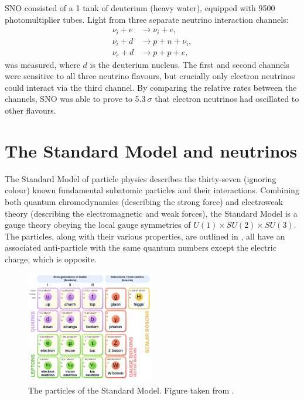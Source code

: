 SNO consisted of a \SI{1}{} tank of deuterium (heavy water), equipped with 9500
photomultiplier tubes. Light from three separate neutrino interaction channels:
\begin{align} %
    \nu_{i}+e & \rightarrow \nu_{i}+e, \\
    \nu_{i}+d & \rightarrow p+n+\nu_{i}, \\
    \nu_{e}+d & \rightarrow p+p+e,
\end{align}
was measured, where $d$ is the deuterium nucleus. The first and second channels were sensitive to
all three neutrino flavours, but crucially only electron neutrinos could interact via the third
channel. By comparing the relative rates between the channels, SNO was able to prove to
5.3$~\sigma$ that electron neutrinos had oscillated to other flavours.

\section{The Standard Model and neutrinos} %
\label{sec:theory_sm} %

The Standard Model of particle physics describes the thirty-seven (ignoring colour) known
fundamental subatomic particles and their interactions. Combining both quantum chromodynamics
(describing the strong force) and electroweak theory (describing the electromagnetic and weak
forces), the Standard Model is a gauge theory obeying the local gauge symmetries of $U(1) \times
SU(2) \times SU(3)$. The particles, along with their various properties, are outlined in
, all have an associated anti-particle with the same quantum numbers except the
electric charge, which is opposite.

\begin{figure} %
    \includegraphics[origin=c,width=0.5\textwidth]{diagrams/3-theory/sm.pdf}
    \caption[The particles of the Standard Model]
    {The particles of the Standard Model. Figure taken from .}
    \label{fig:sm}
\end{figure}

